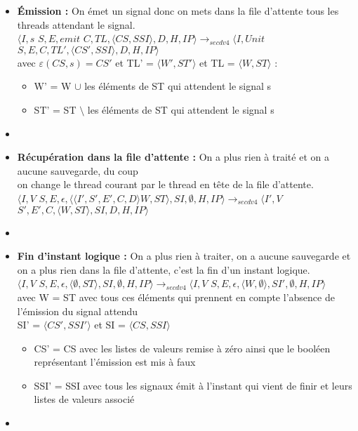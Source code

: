\documentclass[10pt,a4paper]{article}
\begin{document}
\begin{enumerate}
\begin{itemize}
			    	\item[] \textbf{Émission :} On émet un signal donc on mets dans la file d'attente tous les threads attendant le signal.
			    	\\ $\langle I,s$ $S,E,emit$ $C,TL,\langle CS,SSI\rangle,D,H,IP\rangle 
			    	\longrightarrow_{secdv4} \langle I,Unit$ $S,E,C,TL',\langle CS',SSI\rangle,D,H,IP\rangle$\\
			    	avec $\varepsilon(CS,s) = CS'$ et TL' = $\langle W',ST'\rangle$ et TL = $\langle W,ST\rangle$ :
			    	\begin{itemize}
			    		\item[] W' = W $\cup$ les éléments de ST qui attendent le signal s 
			    		\item[] ST' = ST $\setminus$ les éléments de ST qui attendent le signal s 
			    	\end{itemize}
			    	\item[]
			    	
			    	\item[] \textbf{Récupération dans la file d'attente :} On a plus rien à traité et on a aucune sauvegarde, du coup 
			    	\\on change le thread courant par le thread en tête de la file d'attente.
			    	\\$\langle I,V$ $S,E,\epsilon,\langle\langle I',S',E',C,D\rangle W,ST\rangle,SI,\emptyset,H,IP\rangle 
			    	\longrightarrow_{secdv4} \langle I',V$ $S',E',C,\langle W,ST\rangle,SI,D,H,IP\rangle$
			    	\item[]
			    	
			    	\item[] \textbf{Fin d'instant logique :} On a plus rien à traiter, on a aucune sauvegarde et on a plus rien dans la file d'attente, c'est la fin d'un instant logique.
			    	\\$\langle I,V$ $S,E,\epsilon,\langle\emptyset,ST\rangle,SI,\emptyset,H,IP\rangle 
			    	\longrightarrow_{secdv4} \langle I,V$ $S,E,\epsilon,\langle W,\emptyset\rangle,SI',\emptyset,H,IP\rangle$\\
			    	avec W = ST avec tous ces éléments qui prennent en compte l'absence de l'émission du signal attendu
			    	\\ SI' = $\langle CS',SSI'\rangle$ et SI = $\langle CS,SSI\rangle$
			    	\begin{itemize}
			    		\item[] CS' = CS avec les listes de valeurs remise à zéro ainsi que le booléen représentant l'émission est mis à faux
			    		\item[] SSI' = SSI avec tous les signaux émit à l'instant qui vient de finir et leurs listes de valeurs associé
			    	\end{itemize}
			    	\item[]
			    	

\end{itemize}
\end{enumerate}
\end{document}
